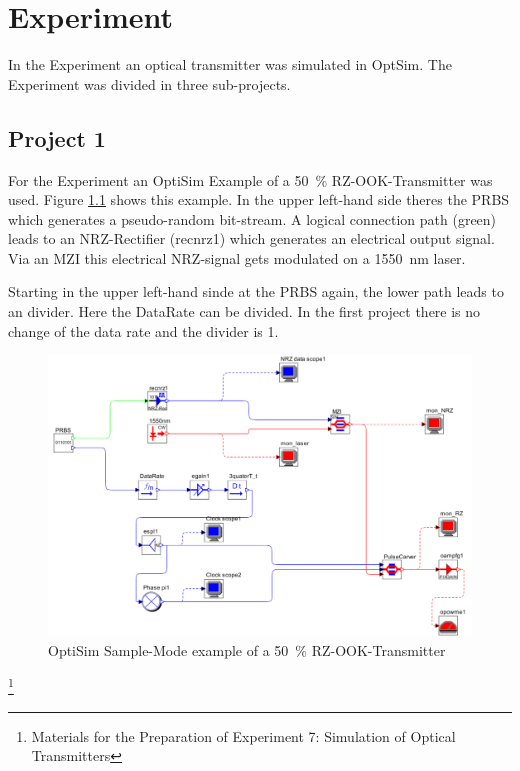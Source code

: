 \chapter{Experiment}
\label{ch:experiment}

In the Experiment an optical transmitter was simulated in OptSim. The Experiment was divided in three sub-projects.

\section{Project 1}
\label{sec:P1}
For the Experiment an OptiSim Example of a 50~\% RZ-OOK-Transmitter was used. Figure \ref{fig:P1_aufbau} shows this example\footnotemark[3]. In the upper left-hand side theres the PRBS which generates a pseudo-random bit-stream. A logical connection path (green) leads to an NRZ-Rectifier (recnrz1) which generates an electrical output signal. Via an MZI this electrical NRZ-signal gets modulated on a 1550~nm laser. 

Starting in the upper left-hand sinde at the PRBS again, the lower path leads to an divider. Here the DataRate can be divided. In the first project there is no change of the data rate and the divider is 1. 

\begin{figure}%
\includegraphics[width=\columnwidth]{Grafiken/P1_aufbau.jpg}%
\caption{OptiSim Sample-Mode example of a 50~\% RZ-OOK-Transmitter}%
\label{fig:P1_aufbau}%
\end{figure}


\footnote[3]{Materials for the Preparation of Experiment 7: Simulation of Optical Transmitters}
